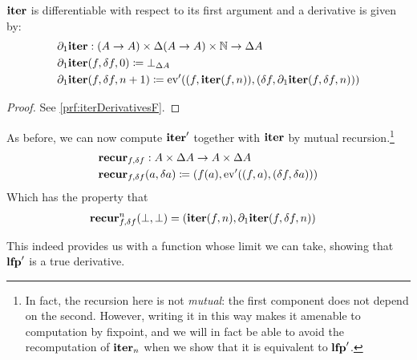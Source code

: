 \begin{prop}[name=Derivative of the iteration map with respect to $f$, restate=iterDerivativesF]
  \label{prop:iterDerivativesF}
  $\mathbf{iter}$ is differentiable with respect to its first argument and a derivative is given by:
  \begin{align*}
    &\partial_1{\mathbf{iter}} : (A \rightarrow A) \times \Delta (A \rightarrow A) \times \mathbb{N} \rightarrow \Delta A\\
    &\partial_1{\mathbf{iter}} (f, \delta f, 0) \coloneqq \bot_{\Delta A}\\
    &\partial_1{\mathbf{iter}} (f, \delta f, n + 1) \coloneqq \operatorname{ev}'((f, \mathbf{iter}(f, n)), (\delta f, \partial_1{\mathbf{iter}}(f, \delta f, n)))
  \end{align*}
\end{prop}
\ifproofs
\begin{proof}
  See \cref{prf:iterDerivativesF}.
\end{proof}
\fi

As before, we can now compute $\mathbf{iter}'$ together with $\mathbf{iter}$ by
mutual recursion.\footnote{
  In fact, the recursion here is not \emph{mutual}: the first component does not
  depend on the second. However, writing it in this way makes it
  amenable to computation by fixpoint, and we will in fact be able to avoid the
  recomputation of $\mathbf{iter}_n$ when we show that it is equivalent to $\mathbf{lfp}'$.
}
\begin{align*}
  &\mathbf{recur}_{f, \delta f} : A \times \Delta A \rightarrow A \times \Delta A\\
  &\mathbf{recur}_{f, \delta f} (a, \delta a) \coloneqq (f(a), \operatorname{ev}'((f, a), (\delta f, \delta a)))
\end{align*}
Which has the property that
\begin{align*}
  &\mathbf{recur}_{f, \delta f}^n (\bot, \bot) = (\mathbf{iter}(f, n), \partial_1{\mathbf{iter}}(f, \delta f, n))
\end{align*}

This indeed provides us with a function whose limit we can take, showing
that $\mathbf{lfp}'$ is a true derivative.

